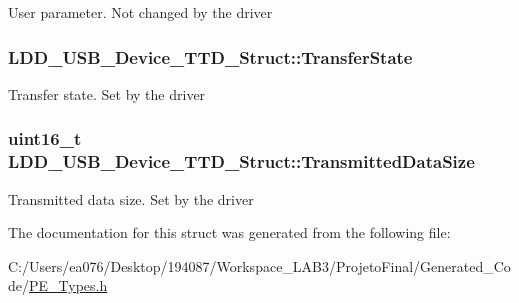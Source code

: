 User parameter. Not changed by the driver \hypertarget{struct_l_d_d___u_s_b___device___t_t_d___struct_aca23e3743f56dc73206b79f885e9130f}{
\subsubsection[{Transfer\-State}]{ L\-D\-D\-\_\-\-U\-S\-B\-\_\-\-Device\-\_\-\-T\-T\-D\-\_\-\-Struct\-::\-Transfer\-State}}\label{struct_l_d_d___u_s_b___device___t_t_d___struct_aca23e3743f56dc73206b79f885e9130f}
Transfer state. Set by the driver \hypertarget{struct_l_d_d___u_s_b___device___t_t_d___struct_aeffbf1300fce5fc9ebf98f5760a96d38}{
\subsubsection[{Transmitted\-Data\-Size}]{\setlength{\rightskip}{0pt plus 5cm}uint16\-\_\-t L\-D\-D\-\_\-\-U\-S\-B\-\_\-\-Device\-\_\-\-T\-T\-D\-\_\-\-Struct\-::\-Transmitted\-Data\-Size}}\label{struct_l_d_d___u_s_b___device___t_t_d___struct_aeffbf1300fce5fc9ebf98f5760a96d38}
Transmitted data size. Set by the driver 

The documentation for this struct was generated from the following file\-:\begin{DoxyCompactItemize}
\item 
C\-:/\-Users/ea076/\-Desktop/194087/\-Workspace\-\_\-\-L\-A\-B3/\-Projeto\-Final/\-Generated\-\_\-\-Code/\hyperlink{_p_e___types_8h}{P\-E\-\_\-\-Types.\-h}\end{DoxyCompactItemize}
